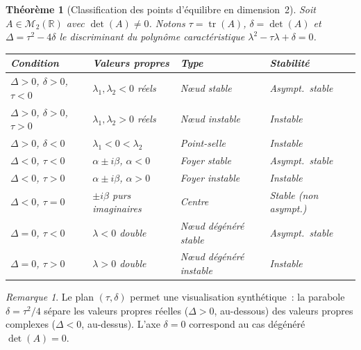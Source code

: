 \documentclass[12pt,a4paper,openany]{book}
\theoremstyle{definition}
\theoremstyle{plain}
\newtheorem{theoreme}[definition]{Théorème}
\theoremstyle{remark}
\newtheorem{remarque}[definition]{Remarque}
\newcommand{\R}{\mathbb{R}}
\DeclareMathOperator{\tr}{tr}
\begin{document}
\begin{theoreme}[Classification des points d'équilibre en dimension~2]\label{thm:classif-2d}
  Soit $A \in \mathcal{M}_2(\R)$ avec $\det(A) \neq 0$. Notons
  $\tau = \tr(A)$, $\delta = \det(A)$ et $\Delta = \tau^2 - 4\delta$
  le discriminant du polynôme caractéristique $\lambda^2 - \tau\lambda + \delta = 0$.

  \begin{center}
  \renewcommand{\arraystretch}{1.4}
  \begin{tabular}{llll}
    \toprule
    \textbf{Condition} & \textbf{Valeurs propres} & \textbf{Type} & \textbf{Stabilité} \\
    \midrule
    $\Delta > 0$, $\delta > 0$, $\tau < 0$
      & $\lambda_1, \lambda_2 < 0$ réels
      & N\oe ud stable\index{noeud stable} & Asympt.\ stable \\
    $\Delta > 0$, $\delta > 0$, $\tau > 0$
      & $\lambda_1, \lambda_2 > 0$ réels
      & N\oe ud instable\index{noeud instable} & Instable \\
    $\Delta > 0$, $\delta < 0$
      & $\lambda_1 < 0 < \lambda_2$
      & Point-selle\index{point-selle} & Instable \\
    $\Delta < 0$, $\tau < 0$
      & $\alpha \pm i\beta$, $\alpha < 0$
      & Foyer stable\index{foyer stable} & Asympt.\ stable \\
    $\Delta < 0$, $\tau > 0$
      & $\alpha \pm i\beta$, $\alpha > 0$
      & Foyer instable\index{foyer instable} & Instable \\
    $\Delta < 0$, $\tau = 0$
      & $\pm i\beta$ purs imaginaires
      & Centre\index{centre} & Stable (non asympt.) \\
    $\Delta = 0$, $\tau < 0$
      & $\lambda < 0$ double
      & N\oe ud dégénéré stable & Asympt.\ stable \\
    $\Delta = 0$, $\tau > 0$
      & $\lambda > 0$ double
      & N\oe ud dégénéré instable & Instable \\
    \bottomrule
  \end{tabular}
  \end{center}
\end{theoreme}

\begin{remarque}\label{rem:trace-det}
  Le plan $(\tau, \delta)$ permet une visualisation synthétique~:
  la parabole $\delta = \tau^2/4$ sépare les valeurs propres réelles
  ($\Delta > 0$, au-dessous) des valeurs propres complexes
  ($\Delta < 0$, au-dessus). L'axe $\delta = 0$ correspond au cas
  dégénéré $\det(A)=0$.
\end{remarque}
\end{document}
